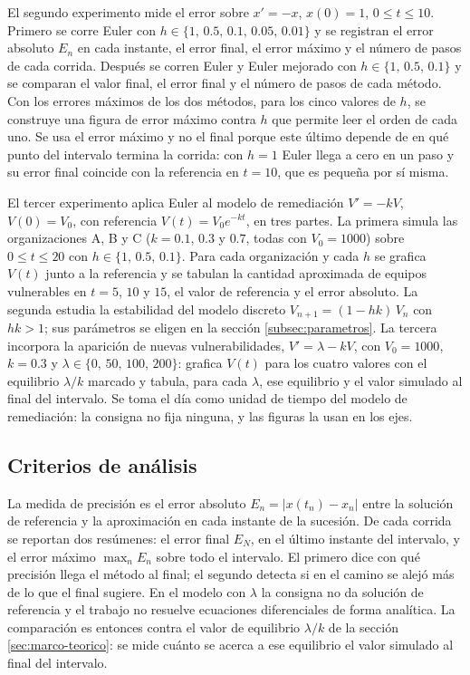El segundo experimento mide el error sobre $x' = -x$, $x(0) = 1$, $0 \le t \le 10$. Primero se
corre Euler con $h \in \{1,\, 0.5,\, 0.1,\, 0.05,\, 0.01\}$ y se registran el error absoluto
$E_n$ en cada instante, el error final, el error máximo y el número de pasos de cada corrida.
Después se corren Euler y Euler mejorado con $h \in \{1,\, 0.5,\, 0.1\}$ y se comparan el valor
final, el error final y el número de pasos de cada método. Con los errores máximos de los dos
métodos, para los cinco valores de $h$, se construye una figura de error máximo contra $h$ que
permite leer el orden de cada uno. Se usa el error máximo y no el final porque este último
depende de en qué punto del intervalo termina la corrida: con $h = 1$ Euler llega a cero en un
paso y su error final coincide con la referencia en $t = 10$, que es pequeña por sí misma.

El tercer experimento aplica Euler al modelo de remediación $V' = -kV$, $V(0) = V_0$, con
referencia $V(t) = V_0 e^{-kt}$, en tres partes. La primera simula las organizaciones A, B y C
($k = 0.1$, $0.3$ y $0.7$, todas con $V_0 = 1000$) sobre $0 \le t \le 20$ con
$h \in \{1,\, 0.5,\, 0.1\}$. Para cada organización y cada $h$ se grafica $V(t)$ junto a la
referencia y se tabulan la cantidad aproximada de equipos vulnerables en $t = 5$, $10$ y $15$, el
valor de referencia y el error absoluto. La segunda estudia la estabilidad del modelo discreto
$V_{n+1} = (1 - hk)\,V_n$ con $hk > 1$; sus parámetros se eligen en la sección
\ref{subsec:parametros}. La tercera incorpora la aparición de nuevas vulnerabilidades,
$V' = \lambda - kV$, con $V_0 = 1000$, $k = 0.3$ y $\lambda \in \{0,\, 50,\, 100,\, 200\}$:
grafica $V(t)$ para los cuatro valores con el equilibrio $\lambda/k$ marcado y tabula, para cada
$\lambda$, ese equilibrio y el valor simulado al final del intervalo. Se toma el día como unidad
de tiempo del modelo de remediación: la consigna no fija ninguna, y las figuras la usan en los
ejes.

\subsection{Criterios de análisis}
\label{subsec:criterios}

La medida de precisión es el error absoluto $E_n = |x(t_n) - x_n|$ entre la solución de
referencia y la aproximación en cada instante de la sucesión. De cada corrida se reportan dos
resúmenes: el error final $E_N$, en el último instante del intervalo, y el error máximo
$\max_n E_n$ sobre todo el intervalo. El primero dice con qué precisión llega el método al final;
el segundo detecta si en el camino se alejó más de lo que el final sugiere. En el modelo con
$\lambda$ la consigna no da solución de referencia y el trabajo no resuelve ecuaciones
diferenciales de forma analítica. La comparación es entonces contra el valor de equilibrio
$\lambda/k$ de la sección \ref{sec:marco-teorico}: se mide cuánto se acerca a ese equilibrio el
valor simulado al final del intervalo.

